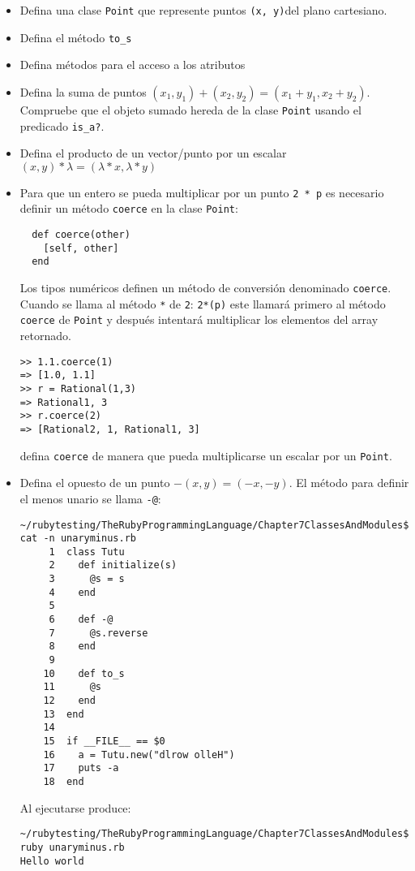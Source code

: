 
\begin{itemize}
\item
Defina una clase \verb|Point| que represente puntos \verb|(x, y)|del plano cartesiano.
\item
Defina el método \verb|to_s|
\item
Defina métodos para el acceso a los atributos
\item
Defina la suma de puntos $(x_1,y_1) + (x_2, y_2) = (x_1 + y_1, x_2+y_2)$.
Compruebe que el objeto sumado hereda de la clase \verb|Point| usando el predicado \verb|is_a?|.
\item
Defina el producto de un vector/punto por un escalar $(x,y) * \lambda = (\lambda * x, \lambda * y)$
\item
Para que un entero se pueda multiplicar por un punto \verb|2 * p| es necesario definir un método
\verb|coerce| en la clase \verb|Point|:
\begin{verbatim}
  def coerce(other)
    [self, other]
  end 
\end{verbatim}
Los tipos numéricos definen un método de conversión denominado \verb|coerce|.
Cuando se llama al método \verb|*| de \verb|2|: \verb|2*(p)|
este llamará primero al método \verb|coerce| de \verb|Point| y después 
intentará multiplicar los elementos del array retornado.
\begin{verbatim}
>> 1.1.coerce(1)
=> [1.0, 1.1]
>> r = Rational(1,3)
=> Rational1, 3
>> r.coerce(2)
=> [Rational2, 1, Rational1, 3]
\end{verbatim}
defina \verb|coerce| de manera que pueda multiplicarse un escalar por un \verb|Point|.
\item
Defina el opuesto de un punto $-(x, y) = (-x, -y)$.
El método para definir el menos unario se llama \verb|-@|:
\begin{verbatim}
~/rubytesting/TheRubyProgrammingLanguage/Chapter7ClassesAndModules$ cat -n unaryminus.rb 
     1  class Tutu
     2    def initialize(s)
     3      @s = s
     4    end
     5  
     6    def -@
     7      @s.reverse
     8    end
     9  
    10    def to_s
    11      @s
    12    end
    13  end
    14  
    15  if __FILE__ == $0
    16    a = Tutu.new("dlrow olleH")
    17    puts -a
    18  end
\end{verbatim}
Al ejecutarse produce:
\begin{verbatim}
~/rubytesting/TheRubyProgrammingLanguage/Chapter7ClassesAndModules$ ruby unaryminus.rb 
Hello world
\end{verbatim}

\end{itemize}
